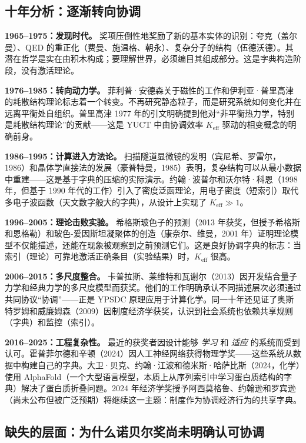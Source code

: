 \documentclass[12pt,a4paper]{article}
\begin{document}
	\subsection{十年分析：逐渐转向协调}
	
	\textbf{1965–1975：发现时代。} 奖项压倒性地奖励了新的基本实体的识别：夸克（盖尔曼）、QED 的重正化（费曼、施温格、朝永）、复杂分子的结构（伍德沃德）。其潜在哲学是实在由积木构成；要理解世界，必须编目其组成部分。这是字典构造阶段，没有激活理论。
	
	\textbf{1976–1985：转向动力学。} 菲利普·安德森关于磁性的工作和伊利亚·普里高津的耗散结构理论标志着一个转变。不再研究静态粒子，而是研究系统如何变化并在远离平衡处自组织。普里高津 1977 年的引文明确提到他对“非平衡热力学，特别是耗散结构理论”的贡献——这是 YUCT 中由协调效率 \(K_{\mathrm{eff}}\) 驱动的相变概念的明确前身。
	
	\textbf{1986–1995：计算进入方法论。} 扫描隧道显微镜的发明（宾尼希、罗雷尔，1986）和晶体学直接法的发展（豪普特曼，1985）表明，复杂结构可以从最小数据中重建——这是基于字典的压缩的实际演示。约翰·波普尔和沃尔特·科恩（1998 年，但基于 1990 年代的工作）引入了密度泛函理论，用电子密度（短索引）取代多电子波函数（天文数字般大的字典），从设计上实现了 \(K_{\mathrm{eff}} \gg 1\)。
	
	\textbf{1996–2005：理论击败实验。} 希格斯玻色子的预测（2013 年获奖，但授予希格斯和恩格勒）和玻色-爱因斯坦凝聚体的创造（康奈尔、维曼，2001 年）证明理论模型不仅能描述，还能在现象被观察到之前预测它们。这是良好协调字典的标志：当索引（理论）可靠地激活正确条目（实验结果）时，\(K_{\mathrm{eff}}\) 很高。
	
	\textbf{2006–2015：多尺度整合。} 卡普拉斯、莱维特和瓦谢尔（2013）因开发结合量子力学和经典力学的多尺度模型而获奖。他们的工作明确承认不同描述层次必须通过共同协议“协调”——正是 YPSDC 原理应用于计算化学。同一十年还见证了奥斯特罗姆和威廉姆森（2009）因制度经济学获奖，认识到社会系统也依赖共享规则（字典）和监控（索引）。
	
	\textbf{2016–2025：工程复杂性。} 最近的获奖者因设计能够 \emph{学习} 和 \emph{适应} 的系统而受到认可。霍普菲尔德和辛顿（2024）因人工神经网络获得物理学奖——这些系统从数据中构建自己的字典。大卫·贝克、约翰·江波和德米斯·哈萨比斯（2024，化学）使用 AlphaFold（一个大型语言模型，本质上从序列索引中学习蛋白质结构的字典）解决了蛋白质折叠问题。2024 年经济学奖授予阿西莫格鲁、约翰逊和罗宾逊（尚未公布但被广泛预期）将继续这一主题：制度作为协调经济行为的共享字典。
	
	\subsection{缺失的层面：为什么诺贝尔奖尚未明确认可协调}
	
\end{document}
